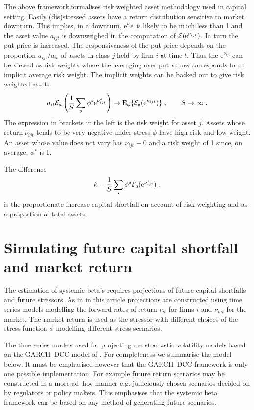 \documentclass[authoryear]{elsarticle}
\newcommand{\e}{\mathrm{e}}
\newcommand{\Ex}{{\cal E}}
\newcommand{\cq}{\ , \qquad}
\newcommand{\be}[1]{\begin{equation}\label{#1}}
\newcommand{\ee}{\end{equation}}
\begin{document}
The above framework formalises risk weighted asset methodology  used in capital setting.   Easily (dis)stressed assets have a return distribution sensitive to market downturn.   This implies, in a downturn, $\e^{\nu_{ijt}}$ is likely to be much less than 1 and the asset value $a_{ijt}$ is downweighed in the computation of $\Ex(\e^{\nu_{ijt}})$.  In turn the put price is increased.  The responsiveness of the put price depends on the proportion $a_{ijt}/a_{it}$ of assets in class $j$ held by firm $i$ at time $t$.   Thus the $\e^{\nu_{ijt}}$ can be viewed  as risk weights where the averaging over put values corresponds  to an implicit average risk weight.   The implicit weights can be backed out to give risk weighted assets
\be{rwa}
a_{it}\Ex_a\left( \frac{1}{S}\sum_s\phi^s\e^{\nu_{ijt}^s}\right)\rightarrow \Es\{\Ex_a(\e^{\nu_{ijt}})\}\cq S\rightarrow\infty \ .
\ee
The expression in  brackets in the left is the risk weight for asset $j$.   Assets whose return $\nu_{ijt}$  tends to be very negative under stress $\phi$ have high risk and low weight.  An asset whose value does not vary has $\nu_{ijt}\equiv 0$ and  a risk weight of 1 since, on average, $\phi^s$ is 1.

The difference
$$
k - \frac{1}{S}\sum_s\phi^s\Ex_a(\e^{\nu_{ijt}^s})\ ,
$$
is the proportionate increase capital shortfall on account of risk weighting and as a proportion of total assets.

\section{Simulating future capital shortfall and market return}

The estimation of systemic beta's requires  projections of future capital shortfalls and future stressors.   As in \cite{brownlees2015} in this article projections are constructed  using time series models modelling the forward rates of return $\nu_{it}$ for firms $i$ and $\nu_{mt}$ for the market.   The market return is used as the stressor with different choices of the stress function $\phi$ modelling different stress scenarios.

The time series models used for projecting are stochastic volatility models based on the GARCH--DCC model of \cite{engle2002dynamic}.   For completeness we summarise the model below.    It must be emphasised however that the GARCH--DCC framework is only one possible implementation.   For example future return scenarios may be constructed in a more ad--hoc manner e.g. judiciously chosen scenarios decided on by regulators or policy makers.   This emphasises that the  systemic beta framework can be based on  any  method of generating  future  scenarios.
\end{document}
